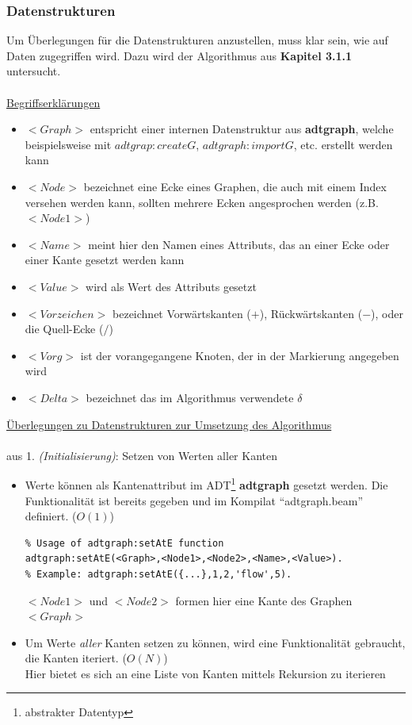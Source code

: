 \documentclass[11pt]{article}
\begin{document}
    \subsubsection{Datenstrukturen}
    Um \"Uberlegungen f\"ur die Datenstrukturen anzustellen, muss klar sein, wie auf Daten zugegriffen wird. Dazu wird der Algorithmus aus \textbf{Kapitel 3.1.1} untersucht.\\~\\
    \underline{Begriffserkl\"arungen}
    \begin{itemize}
        \item $<Graph>$ entspricht einer internen Datenstruktur aus \textbf{adtgraph}, welche beispielsweise mit $adtgrap:createG$, $adtgraph:importG$, etc. erstellt werden kann
        \item $<Node>$ bezeichnet eine Ecke eines Graphen, die auch mit einem Index versehen werden kann, sollten mehrere Ecken angesprochen werden (z.B. $<Node 1>$)
        \item $<Name>$ meint hier den Namen eines Attributs, das an einer Ecke oder einer Kante gesetzt werden kann
        \item $<Value>$ wird als Wert des Attributs gesetzt
        \item $<Vorzeichen>$ bezeichnet Vorw\"artskanten ($+$), R\"uckw\"artskanten ($-$), oder die Quell-Ecke ($/$)
        \item $<Vorg>$ ist der vorangegangene Knoten, der in der Markierung angegeben wird
        \item $<Delta>$ bezeichnet das im Algorithmus verwendete $\delta$
    \end{itemize}
    \newpage
    \underline{\"Uberlegungen zu Datenstrukturen zur Umsetzung des Algorithmus}\\~\\
    aus 1. \textit{(Initialisierung)}: Setzen von Werten aller Kanten
    \begin{itemize}
        \item Werte k\"onnen als Kantenattribut im ADT\footnote{abstrakter Datentyp} \textbf{adtgraph} gesetzt werden. Die Funktionalit\"at ist bereits gegeben und im Kompilat "`adtgraph.beam"' definiert. ($O(1)$)
\begin{lstlisting}
% Usage of adtgraph:setAtE function
adtgraph:setAtE(<Graph>,<Node1>,<Node2>,<Name>,<Value>).
% Example: adtgraph:setAtE({...},1,2,'flow',5).
\end{lstlisting}
        $<Node1>$ und $<Node2>$ formen hier eine Kante des Graphen $<Graph>$
        \item Um Werte \textit{aller} Kanten setzen zu k\"onnen, wird eine Funktionalit\"at gebraucht, die Kanten iteriert. ($O(N)$)\\
        Hier bietet es sich an eine Liste von Kanten mittels Rekursion zu iterieren
    \end{itemize}
\end{document}
